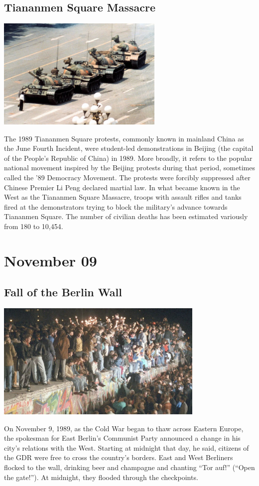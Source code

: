 \documentclass[11pt]{report}
\begin{document}
\subsection{Tiananmen Square Massacre}
\vspace{2mm}\begin{center}\includegraphics[width=8cm]{./img/tiananmenMassacre.jpg}\end{center}
The 1989 Tiananmen Square protests, commonly known in mainland China as the June Fourth Incident, were student-led demonstrations in Beijing (the capital of the People's Republic of China) in 1989. More broadly, it refers to the popular national movement inspired by the Beijing protests during that period, sometimes called the '89 Democracy Movement. The protests were forcibly suppressed after Chinese Premier Li Peng declared martial law. In what became known in the West as the Tiananmen Square Massacre, troops with assault rifles and tanks fired at the demonstrators trying to block the military's advance towards Tiananmen Square. The number of civilian deaths has been estimated variously from 180 to 10,454.

\section{November 09}
\subsection{Fall of the Berlin Wall}
\vspace{2mm}\begin{center}\includegraphics[width=10cm]{./img/fallBerlinWall.jpg}\end{center}
On November 9, 1989, as the Cold War began to thaw across Eastern Europe, the spokesman for East Berlin’s Communist Party announced a change in his city’s relations with the West. Starting at midnight that day, he said, citizens of the GDR were free to cross the country’s borders. East and West Berliners flocked to the wall, drinking beer and champagne and chanting “Tor auf!” (“Open the gate!”). At midnight, they flooded through the checkpoints.
\end{document}
